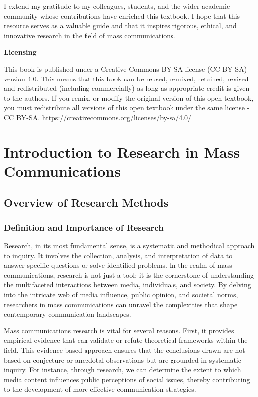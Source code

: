 \documentclass[
]{book}
\begin{document}
I extend my gratitude to my colleagues, students, and the wider academic community whose contributions have enriched this textbook. I hope that this resource serves as a valuable guide and that it inspires rigorous, ethical, and innovative research in the field of mass communications.

\textbf{Licensing}

This book is published under a Creative Commons BY-SA license (CC BY-SA) version 4.0. This means that this book can be reused, remixed, retained, revised and redistributed (including commercially) as long as appropriate credit is given to the authors. If you remix, or modify the original version of this open textbook, you must redistribute all versions of this open textbook under the same license - CC BY-SA. \url{https://creativecommons.org/licenses/by-sa/4.0/}

\chapter{Introduction to Research in Mass Communications}\label{introduction-to-research-in-mass-communications}

\section{Overview of Research Methods}\label{overview-of-research-methods}

\subsection*{Definition and Importance of Research}\label{definition-and-importance-of-research}

Research, in its most fundamental sense, is a systematic and methodical approach to inquiry. It involves the collection, analysis, and interpretation of data to answer specific questions or solve identified problems. In the realm of mass communications, research is not just a tool; it is the cornerstone of understanding the multifaceted interactions between media, individuals, and society. By delving into the intricate web of media influence, public opinion, and societal norms, researchers in mass communications can unravel the complexities that shape contemporary communication landscapes.

Mass communications research is vital for several reasons. First, it provides empirical evidence that can validate or refute theoretical frameworks within the field. This evidence-based approach ensures that the conclusions drawn are not based on conjecture or anecdotal observations but are grounded in systematic inquiry. For instance, through research, we can determine the extent to which media content influences public perceptions of social issues, thereby contributing to the development of more effective communication strategies.
\end{document}
